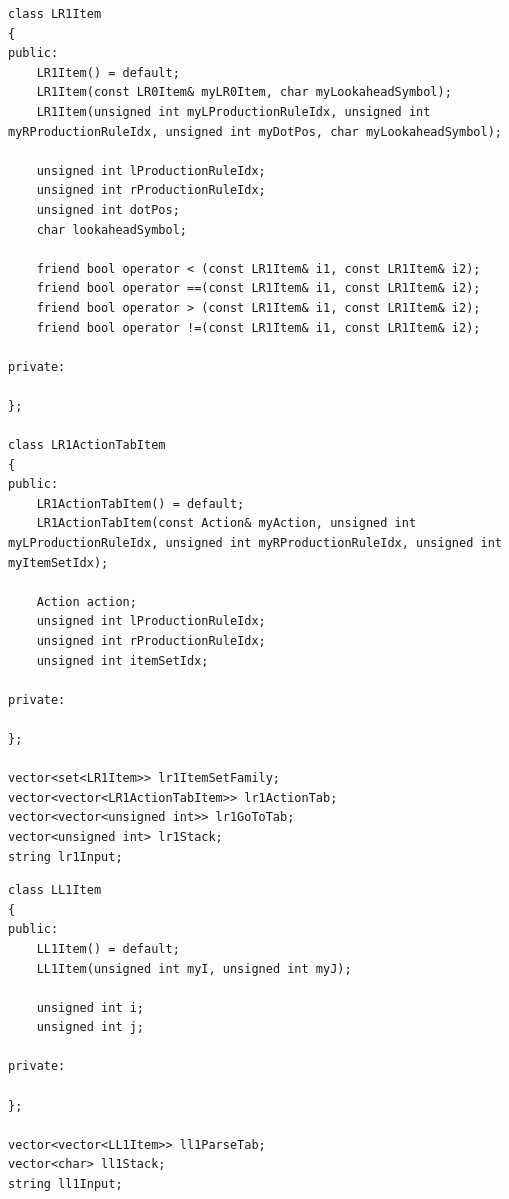 \documentclass[11pt]{article}
\begin{document}
\begin{center}
\begin{lstlisting}[caption = {LR(1)分析器数据结构}, label = {lst: lr1}]
class LR1Item
{
public:
	LR1Item() = default;
	LR1Item(const LR0Item& myLR0Item, char myLookaheadSymbol);
	LR1Item(unsigned int myLProductionRuleIdx, unsigned int myRProductionRuleIdx, unsigned int myDotPos, char myLookaheadSymbol);

	unsigned int lProductionRuleIdx;
	unsigned int rProductionRuleIdx;
	unsigned int dotPos;
	char lookaheadSymbol;

	friend bool operator < (const LR1Item& i1, const LR1Item& i2);
	friend bool operator ==(const LR1Item& i1, const LR1Item& i2);
	friend bool operator > (const LR1Item& i1, const LR1Item& i2);
	friend bool operator !=(const LR1Item& i1, const LR1Item& i2);

private:

};

class LR1ActionTabItem
{
public:
	LR1ActionTabItem() = default;
	LR1ActionTabItem(const Action& myAction, unsigned int myLProductionRuleIdx, unsigned int myRProductionRuleIdx, unsigned int myItemSetIdx);

	Action action;
	unsigned int lProductionRuleIdx;
	unsigned int rProductionRuleIdx;
	unsigned int itemSetIdx;

private:

};

vector<set<LR1Item>> lr1ItemSetFamily;
vector<vector<LR1ActionTabItem>> lr1ActionTab;
vector<vector<unsigned int>> lr1GoToTab;
vector<unsigned int> lr1Stack;
string lr1Input;
\end{lstlisting}
\end{center}
\begin{center}
\begin{lstlisting}[caption = {LL(1)分析器数据结构}, label = {lst: ll1}]
class LL1Item
{
public:
	LL1Item() = default;
	LL1Item(unsigned int myI, unsigned int myJ);

	unsigned int i;
	unsigned int j;

private:

};

vector<vector<LL1Item>> ll1ParseTab;
vector<char> ll1Stack;
string ll1Input;
\end{lstlisting}
\end{center}
\end{document}
